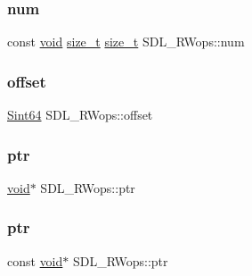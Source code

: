 \mbox{\label{struct_s_d_l___r_wops_a630921d5c84cf48a4a10f9a75e1caa10}} 
\subsubsection{\texorpdfstring{num}{num}}
{\footnotesize\ttfamily const \mbox{\hyperlink{_s_d_l__opengles2__gl2ext_8h_ae5d8fa23ad07c48bb609509eae494c95}{void}} \mbox{\hyperlink{_s_d_l__config_8h_a7c94ea6f8948649f8d181ae55911eeaf}{size\+\_\+t}} \mbox{\hyperlink{_s_d_l__config_8h_a7c94ea6f8948649f8d181ae55911eeaf}{size\+\_\+t}} S\+D\+L\+\_\+\+R\+Wops\+::num}

\mbox{\label{struct_s_d_l___r_wops_ab1ee9d9e4f61b3b30f26160c282ae416}} 
\subsubsection{\texorpdfstring{offset}{offset}}
{\footnotesize\ttfamily \mbox{\hyperlink{_s_d_l__stdinc_8h_a2c1a61d5c466bb74680be0a8cc1b455d}{Sint64}} S\+D\+L\+\_\+\+R\+Wops\+::offset}

\mbox{\label{struct_s_d_l___r_wops_a3f68b93789331775de802d51a2934f0a}} 
\subsubsection{\texorpdfstring{ptr}{ptr}\hspace{0.1cm}{\footnotesize\ttfamily [1/2]}}
{\footnotesize\ttfamily \mbox{\hyperlink{_s_d_l__opengles2__gl2ext_8h_ae5d8fa23ad07c48bb609509eae494c95}{void}}$\ast$ S\+D\+L\+\_\+\+R\+Wops\+::ptr}

\mbox{\label{struct_s_d_l___r_wops_a51baff579726790887a4ca41ce14873c}} 
\subsubsection{\texorpdfstring{ptr}{ptr}\hspace{0.1cm}{\footnotesize\ttfamily [2/2]}}
{\footnotesize\ttfamily const \mbox{\hyperlink{_s_d_l__opengles2__gl2ext_8h_ae5d8fa23ad07c48bb609509eae494c95}{void}}$\ast$ S\+D\+L\+\_\+\+R\+Wops\+::ptr}

